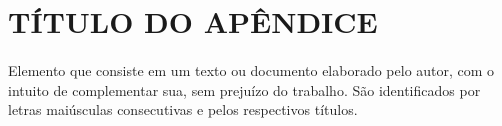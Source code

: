 \section{TÍTULO DO APÊNDICE} \label{ap:defesa}

\paragraph{}Elemento que consiste em um texto ou documento elaborado pelo autor, com o intuito de complementar sua, sem prejuízo do trabalho. São identificados por letras maiúsculas consecutivas e pelos respectivos títulos.